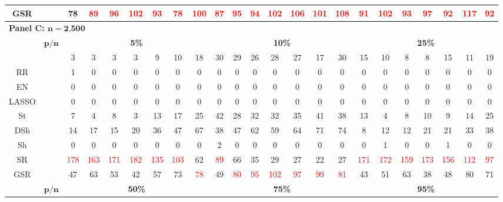 \begin{table}
{\begin{tabular*}{\textwidth}{@{\extracolsep{\fill}}cc|ccccccc|ccccccc|ccccccc@{}}
GSR &  & 78 & \textcolor{red}{89} & \textcolor{red}{96} & \textcolor{red}{102} & \textcolor{red}{93} & \textcolor{red}{78} & \textcolor{red}{100} & \textcolor{red}{87} & \textcolor{red}{95} & \textcolor{red}{94} & \textcolor{red}{102} & \textcolor{red}{106} & \textcolor{red}{101} & \textcolor{red}{108} & \textcolor{red}{91} & \textcolor{red}{102} & \textcolor{red}{93} & \textcolor{red}{97} & \textcolor{red}{92} & \textcolor{red}{117} & \textcolor{red}{92} \\
\hline
\multicolumn{23}{l}{\textbf{Panel C: $\bm{n}=\textbf{2,500}$}} \\
\hline
\multirow{2}{*}{} & $\bm{p/n}$ & \multicolumn{7}{c|}{\textbf{5\%}} & \multicolumn{7}{c|}{\textbf{10\%}} & \multicolumn{7}{c}{\textbf{25\%}} \\
\hline
OLS &  & 3 & 3 & 3 & 3 & 9 & 10 & 18 & 30 & 29 & 26 & 28 & 27 & 17 & 30 & 15 & 10 & 8 & 8 & 15 & 11 & 19 \\
RR &  & 1 & 0 & 0 & 0 & 0 & 0 & 0 & 0 & 0 & 0 & 0 & 0 & 0 & 0 & 0 & 0 & 0 & 0 & 0 & 0 & 0 \\
EN &  & 0 & 0 & 0 & 0 & 0 & 0 & 0 & 0 & 0 & 0 & 0 & 0 & 0 & 0 & 0 & 0 & 0 & 0 & 0 & 0 & 0 \\
LASSO &  & 0 & 0 & 0 & 0 & 0 & 0 & 0 & 0 & 0 & 0 & 0 & 0 & 0 & 0 & 0 & 0 & 0 & 0 & 0 & 0 & 0 \\
St &  & 7 & 4 & 8 & 3 & 13 & 17 & 25 & 42 & 28 & 32 & 32 & 35 & 41 & 38 & 13 & 4 & 8 & 10 & 9 & 14 & 25 \\
DSh &  & 14 & 17 & 15 & 20 & 36 & 47 & 67 & 38 & 47 & 62 & 59 & 64 & 71 & 74 & 8 & 12 & 12 & 21 & 21 & 33 & 38 \\
Sh &  & 0 & 0 & 0 & 0 & 0 & 0 & 0 & 2 & 0 & 0 & 0 & 0 & 0 & 0 & 0 & 1 & 0 & 0 & 1 & 0 & 0 \\
SR &  & \textcolor{red}{178} & \textcolor{red}{163} & \textcolor{red}{171} & \textcolor{red}{182} & \textcolor{red}{135} & \textcolor{red}{103} & 62 & \textcolor{red}{89} & 66 & 35 & 29 & 27 & 22 & 27 & \textcolor{red}{171} & \textcolor{red}{172} & \textcolor{red}{159} & \textcolor{red}{173} & \textcolor{red}{156} & \textcolor{red}{112} & \textcolor{red}{97} \\
GSR &  & 47 & 63 & 53 & 42 & 57 & 73 & \textcolor{red}{78} & 49 & \textcolor{red}{80} & \textcolor{red}{95} & \textcolor{red}{102} & \textcolor{red}{97} & \textcolor{red}{99} & \textcolor{red}{81} & 43 & 51 & 63 & 38 & 48 & 80 & 71 \\
\hline
\multirow{2}{*}{} & $\bm{p/n}$ & \multicolumn{7}{c|}{\textbf{50\%}} & \multicolumn{7}{c|}{\textbf{75\%}} & \multicolumn{7}{c}{\textbf{95\%}} \\

\end{tabular*}}
\end{table}
